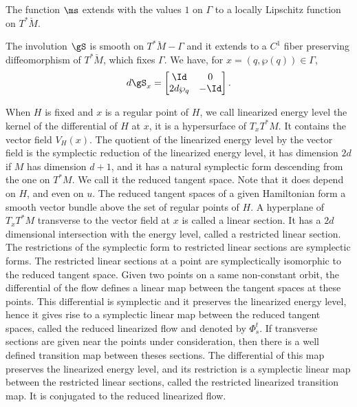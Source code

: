 \begin{prop}\label{prop-sym}
The function $\ms$ extends with the values $1$ on $\Gamma$ to a locally Lipschitz function on $T^*\breve M$.

The involution $\gS$ is smooth on $T^*\breve M-\Gamma$ and it extends to a $C^1$ fiber preserving diffeomorphism of $T^*\breve M$, which fixes $\Gamma$. We have, for $x=(q,\wp(q))\in \Gamma$,
\[
d\gS_{x}=\begin{bmatrix}\Id &0\\2d\wp_q & -\Id\end{bmatrix}.
\]
\end{prop}

When $H$ is fixed and $x$ is a regular point of $H$, we call linearized energy level the kernel of the differential of $H$ at $x$, it is a hypersurface of $T_xT^*M$. It contains the vector field $V_H(x)$. The quotient of the linearized energy level by the vector field is the symplectic reduction of the linearized energy level, it has dimension $2d$ if $M$ has dimension $d+1$, and it
has a natural symplectic form descending from the one on $T^*M$. We call it the reduced tangent space.
Note that it does depend on $H$, and even on $u$. The reduced tangent spaces of a given Hamiltonian form a smooth vector bundle above the set of regular points of $H$. A hyperplane of $T_xT^*M$ transverse to the vector field at $x$ is called a linear section. It has a $2d$ dimensional intersection with the energy level, called a restricted linear section.
The restrictions of the symplectic form to restricted linear sections are symplectic forms.
The restricted linear sections at a point are symplectically isomorphic to the reduced tangent space.
Given two points on a same non-constant orbit, the differential of the flow defines a linear map between the tangent spaces at these points. This differential is symplectic and it preserves the linearized energy level, hence it gives rise to a symplectic linear map between the reduced tangent spaces, called the reduced linearized flow and denoted by $\Phi_s^t$.
If transverse sections are given near the points under consideration, then there is a well defined transition map between theses
sections. The differential of this map preserves the linearized energy level, and its restriction is a symplectic linear map between the restricted linear sections, called the restricted linearized transition map.
It is conjugated to the reduced linearized flow.

